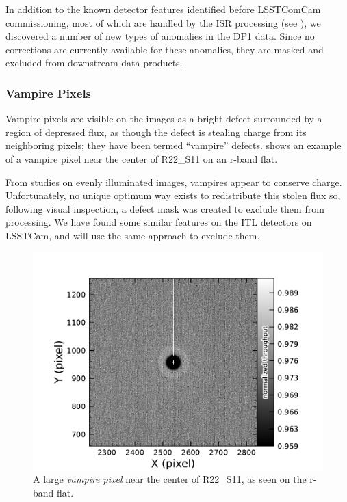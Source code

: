 In addition to the known detector features identified before LSSTComCam commissioning, most of which are handled by the ISR processing (see ), we discovered a number of new types of anomalies in the DP1 data. 
Since no corrections are currently available for these anomalies, they are masked and excluded from downstream data products.

\subsubsection{Vampire Pixels}
Vampire pixels are visible on the images as a bright defect surrounded by a region of depressed flux, as though the defect is stealing charge from its neighboring pixels; they have been termed ``vampire'' defects.
 shows an example of a vampire pixel near the center of R22\_S11 on an r-band flat.

From studies on evenly illuminated images, vampires appear to conserve charge.
Unfortunately, no unique optimum way exists to redistribute this stolen flux so, following visual inspection, a defect mask was created to exclude them from processing.
We have found some similar features on the ITL detectors on LSSTCam, and will use the same approach to exclude them.
\begin{figure}[htb!]
  \centering
  \includegraphics[width=0.98\linewidth]{figures/dp1_isr_anomalies-vampire_pixel.pdf}
  \caption{A large \textit{vampire pixel} near the center of R22\_S11, as seen on the r-band flat.}
   \label{fig:anomalies_vampire_pixels}
\end{figure}

